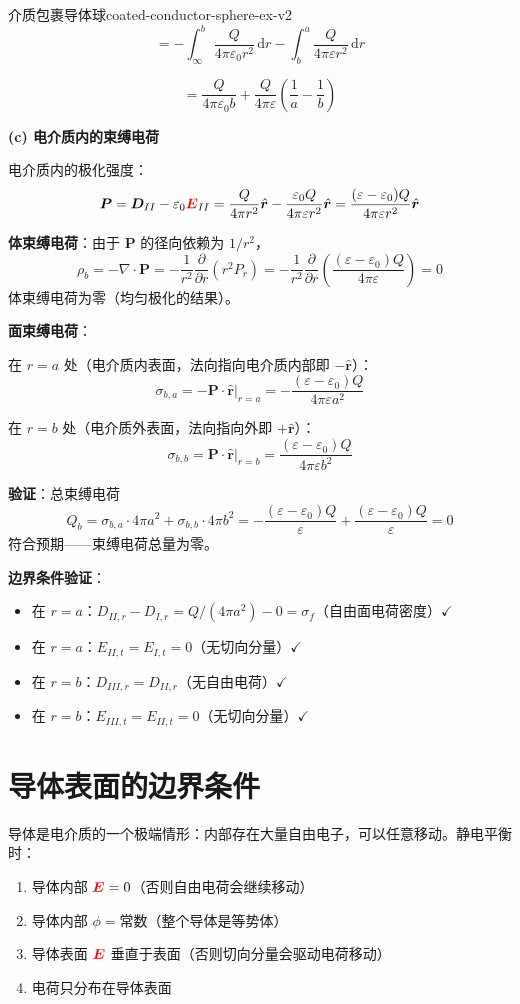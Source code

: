 \documentclass[11pt,a4paper,openany,oneside]{book}
\newcommand{\diff}{\mathrm{d}}
\newcommand{\vecE}{\textcolor{red}{\vect{E}}}
\newcommand{\eps}{\varepsilon}
\newcommand{\vect}[1]{\bm{#1}}
\newcommand{\unitvec}[1]{\hat{\vect{#1}}}
\newcommand{\divg}{\nabla\cdot}
\begin{document}
\begin{example}{介质包裹导体球}{coated-conductor-sphere-ex-v2}
\[
= -\int_\infty^b \frac{Q}{4\pi\eps_0 r^2}\,\diff r - \int_b^a \frac{Q}{4\pi\eps r^2}\,\diff r
\]

\[
= \frac{Q}{4\pi\eps_0 b} + \frac{Q}{4\pi\eps}\left(\frac{1}{a} - \frac{1}{b}\right)
\]

\textbf{(c) 电介质内的束缚电荷}

电介质内的极化强度：
\[
\vect{P} = \vect{D}_{II} - \eps_0\vecE_{II}
= \frac{Q}{4\pi r^2}\unitvec{r} - \frac{\eps_0 Q}{4\pi\eps r^2}\unitvec{r}
= \frac{(\eps - \eps_0)Q}{4\pi\eps r^2}\unitvec{r}
\]

\textbf{体束缚电荷}：由于 $\vect{P}$ 的径向依赖为 $1/r^2$，
\[
\rho_b = -\divg\vect{P} = -\frac{1}{r^2}\frac{\partial}{\partial r}(r^2 P_r)
= -\frac{1}{r^2}\frac{\partial}{\partial r}\left(\frac{(\eps-\eps_0)Q}{4\pi\eps}\right) = 0
\]
体束缚电荷为零（均匀极化的结果）。

\textbf{面束缚电荷}：

在 $r = a$ 处（电介质内表面，法向指向电介质内部即 $-\unitvec{r}$）：
\[
\sigma_{b,a} = -\vect{P}\cdot\unitvec{r}\big|_{r=a} = -\frac{(\eps-\eps_0)Q}{4\pi\eps a^2}
\]

在 $r = b$ 处（电介质外表面，法向指向外即 $+\unitvec{r}$）：
\[
\sigma_{b,b} = \vect{P}\cdot\unitvec{r}\big|_{r=b} = \frac{(\eps-\eps_0)Q}{4\pi\eps b^2}
\]

\textbf{验证}：总束缚电荷
\[
Q_b = \sigma_{b,a}\cdot 4\pi a^2 + \sigma_{b,b}\cdot 4\pi b^2
= -\frac{(\eps-\eps_0)Q}{\eps} + \frac{(\eps-\eps_0)Q}{\eps} = 0
\]
符合预期——束缚电荷总量为零。

\textbf{边界条件验证}：
\begin{itemize}
\item 在 $r = a$：$D_{II,r} - D_{I,r} = Q/(4\pi a^2) - 0 = \sigma_f$（自由面电荷密度）$\checkmark$
\item 在 $r = a$：$E_{II,t} = E_{I,t} = 0$（无切向分量）$\checkmark$
\item 在 $r = b$：$D_{III,r} = D_{II,r}$（无自由电荷）$\checkmark$
\item 在 $r = b$：$E_{III,t} = E_{II,t} = 0$（无切向分量）$\checkmark$
\end{itemize}
\end{example}

\section{导体表面的边界条件}

导体是电介质的一个极端情形：内部存在大量自由电子，可以任意移动。静电平衡时：
\begin{enumerate}
\item 导体内部 $\vecE = 0$（否则自由电荷会继续移动）
\item 导体内部 $\phi = \text{常数}$（整个导体是等势体）
\item 导体表面 $\vecE$ 垂直于表面（否则切向分量会驱动电荷移动）
\item 电荷只分布在导体表面
\end{enumerate}
\end{document}
